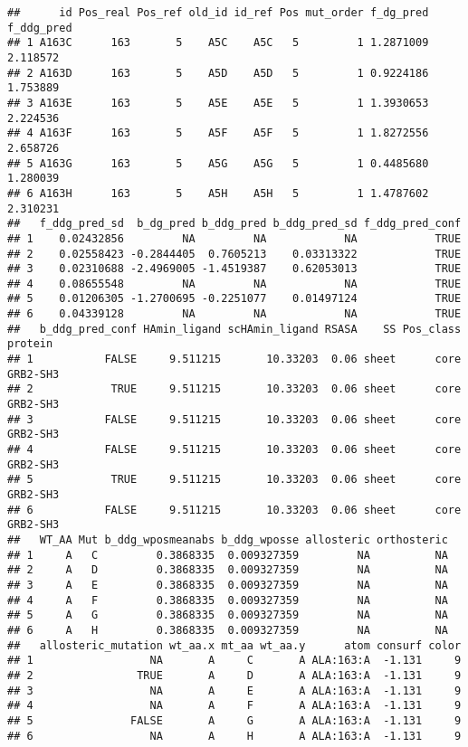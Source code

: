\documentclass[
]{article}
\begin{document}
\begin{verbatim}
##      id Pos_real Pos_ref old_id id_ref Pos mut_order f_dg_pred f_ddg_pred
## 1 A163C      163       5    A5C    A5C   5         1 1.2871009   2.118572
## 2 A163D      163       5    A5D    A5D   5         1 0.9224186   1.753889
## 3 A163E      163       5    A5E    A5E   5         1 1.3930653   2.224536
## 4 A163F      163       5    A5F    A5F   5         1 1.8272556   2.658726
## 5 A163G      163       5    A5G    A5G   5         1 0.4485680   1.280039
## 6 A163H      163       5    A5H    A5H   5         1 1.4787602   2.310231
##   f_ddg_pred_sd  b_dg_pred b_ddg_pred b_ddg_pred_sd f_ddg_pred_conf
## 1    0.02432856         NA         NA            NA            TRUE
## 2    0.02558423 -0.2844405  0.7605213    0.03313322            TRUE
## 3    0.02310688 -2.4969005 -1.4519387    0.62053013            TRUE
## 4    0.08655548         NA         NA            NA            TRUE
## 5    0.01206305 -1.2700695 -0.2251077    0.01497124            TRUE
## 6    0.04339128         NA         NA            NA            TRUE
##   b_ddg_pred_conf HAmin_ligand scHAmin_ligand RSASA    SS Pos_class  protein
## 1           FALSE     9.511215       10.33203  0.06 sheet      core GRB2-SH3
## 2            TRUE     9.511215       10.33203  0.06 sheet      core GRB2-SH3
## 3           FALSE     9.511215       10.33203  0.06 sheet      core GRB2-SH3
## 4           FALSE     9.511215       10.33203  0.06 sheet      core GRB2-SH3
## 5            TRUE     9.511215       10.33203  0.06 sheet      core GRB2-SH3
## 6           FALSE     9.511215       10.33203  0.06 sheet      core GRB2-SH3
##   WT_AA Mut b_ddg_wposmeanabs b_ddg_wposse allosteric orthosteric
## 1     A   C         0.3868335  0.009327359         NA          NA
## 2     A   D         0.3868335  0.009327359         NA          NA
## 3     A   E         0.3868335  0.009327359         NA          NA
## 4     A   F         0.3868335  0.009327359         NA          NA
## 5     A   G         0.3868335  0.009327359         NA          NA
## 6     A   H         0.3868335  0.009327359         NA          NA
##   allosteric_mutation wt_aa.x mt_aa wt_aa.y      atom consurf color
## 1                  NA       A     C       A ALA:163:A  -1.131     9
## 2                TRUE       A     D       A ALA:163:A  -1.131     9
## 3                  NA       A     E       A ALA:163:A  -1.131     9
## 4                  NA       A     F       A ALA:163:A  -1.131     9
## 5               FALSE       A     G       A ALA:163:A  -1.131     9
## 6                  NA       A     H       A ALA:163:A  -1.131     9

\end{verbatim}
\end{document}
